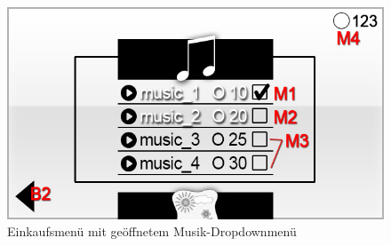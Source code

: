 \begin{figure}[H]
\centering
\includegraphics[scale=0.55]{../gui/_jpeg_numeration/shop_popup.jpg}
\caption{Einkaufsmenü mit geöffnetem Musik-Dropdownmenü}
\label{fig:Einkaufsmenu_Dropdown}
\end{figure}

